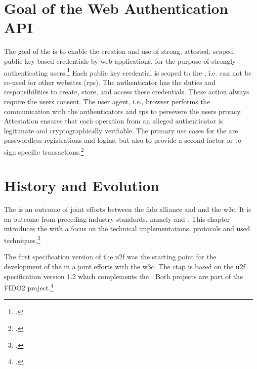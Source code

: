 \section{Goal of the Web Authentication API}

The goal of the \wa{} is to enable \frqq the creation and use of strong, attested, scoped, public key-based credentials by web applications, for the purpose of strongly authenticating users\flqq.\footcites[See][Abstract]{w3c} Each public key credential is scoped to the , i.e. can not be re-used for other websites (\glspl{rp}). The authenticator has the duties and responsibilities to create, store, and access these credentials. These action always require the users consent. The user agent, i.e., browser performs the communication with the authenticators and \glspl{rp} to persevere the users privacy. Attestation ensures that each operation from an alleged authenticator is legitimate and cryptographically verifiable. The primary use cases for the \wa{} are passwordless registrations and logins, but also to provide a second-factor or to sign specific transactions.\footcites[See][Abstract, Chapter 1.2]{w3c}

\section{History and Evolution}

The \wa{} is an outcome of joint efforts between	 the \gls{fido} alliance and and the \gls{w3c}. It is an outcome from preceding industry standards, namely  and . This chapter introduces the \wa{} with a focus on the technical implementations, protocols and used techniques.\footcites[See][24]{fido-ct-3}

The first specification version of the \gls{u2f} was the starting point for the development of the \wa{} in a joint efforts with the \gls{w3c}. The \gls{ctap} is based on the \gls{u2f} specification version 1.2 which complements the \wa. Both projects are part of the FIDO2 project.\footcite[See][169--170]{grimes2017hacking}
